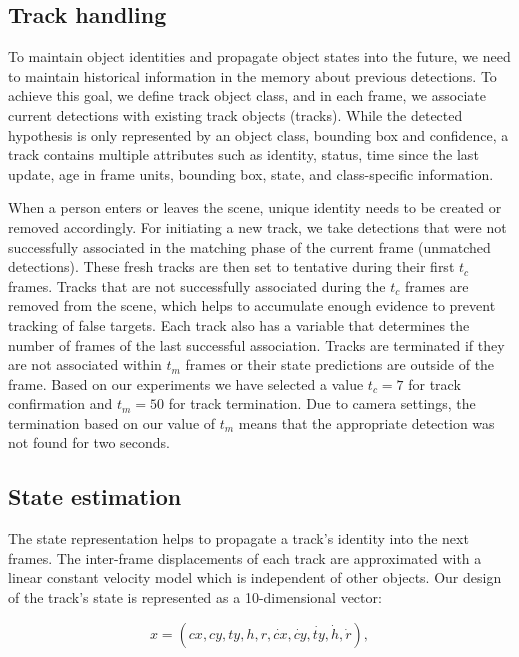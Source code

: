     \subsection{Track handling}
        To maintain object identities and propagate object states into the future, we need to maintain historical information in the memory about previous detections. To achieve this goal, we define track object class, and in each frame, we associate current detections with existing track objects (tracks). While the detected hypothesis is only represented by an object class, bounding box and confidence, a track contains multiple attributes such as identity, status, time since the last update, age in frame units, bounding box, state, and class-specific information.
        
        When a person enters or leaves the scene, unique identity needs to be created or removed accordingly. For initiating a new track, we take detections that were not successfully associated in the matching phase of the current frame (unmatched detections). These fresh tracks are then set to tentative during their first $t_c$ frames. Tracks that are not successfully associated during the $t_c$ frames are removed from the scene, which helps to accumulate enough evidence to prevent tracking of false targets. Each track also has a variable that determines the number of frames of the last successful association. Tracks are terminated if they are not associated within $t_m$ frames or their state predictions are outside of the frame. Based on our experiments we have selected a value $t_c = 7$ for track confirmation and $t_m = 50$ for track termination. Due to camera settings, the termination based on our value of $t_m$ means that the appropriate detection was not found for two seconds. 
        
    \subsection{State estimation}
        The state representation helps to propagate a track's identity into the next frames. The inter-frame displacements of each track are approximated with a linear constant velocity model which is independent of other objects. Our design of the track's state is represented as a 10-dimensional vector:
        
        \begin{equation}\label{state_vector}
            x = \left(cx, cy, ty, h, r, \dot{cx}, \dot{cy}, \dot{ty}, \dot{h}, \dot{r} \right), 
        \end{equation}
        
